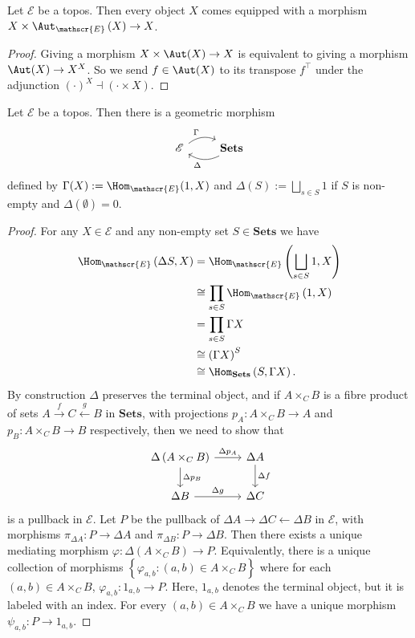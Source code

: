 \begin{lemma}
Let $\mathscr{E}$ be a topos. Then every object $X$ comes equipped with a morphism $X \times \Aut_{\mathscr{E}}\left(X \right) \to X$.
\end{lemma}
\begin{proof}
Giving a morphism $X \times \Aut(X) \to X$ is equivalent to giving a morphism $\Aut(X) \to X^X$. So we send $f \in \Aut(X)$ to its transpose $f^\intercal$ under the adjunction $\left( \cdot \right)^X \dashv \left( \cdot \times X\right)$.
\end{proof}

\begin{proposition}
Let $\mathscr{E}$ be a topos. Then there is a geometric morphism
\[ \begin{tikzcd} \mathscr{E} \arrow[r, bend left, "\Gamma"] & \mathbf{Sets} \arrow[l, bend left, "\Delta"] \end{tikzcd} \]
defined by $\Gamma(X) := \Hom_{\mathscr{E}}(1, X)$ and $\Delta(S) := \bigsqcup_{s \in S} 1$ if $S$ is non-empty and $\Delta(\emptyset) = 0$.
\end{proposition}
\begin{proof}
For any $X \in \mathscr{E}$ and any non-empty set $S \in \mathbf{Sets}$ we have
\begin{align*}
\Hom_{\mathscr{E}}\left(\Delta S, X \right) &= \Hom_{\mathscr{E}} \left( \bigsqcup_{s \in S} 1, X \right) \\
&\cong \prod_{s \in S} \Hom_{\mathscr{E}} \left(1, X \right) \\
&= \prod_{s \in S} \Gamma X \\
&\cong \left(\Gamma X \right)^{S} \\
&\cong \Hom_{\mathbf{Sets}}\left( S, \Gamma X \right).
\end{align*}
By construction $\Delta$ preserves the terminal object, and if $A \times_C B$ is a fibre product of sets $A \xrightarrow{f} C \xleftarrow{g} B$ in $\mathbf{Sets}$, with projections $p_A : A \times_C B \to A$ and $p_B : A \times_C B \to B$ respectively, then we need to show that
\[ \begin{tikzcd}
\Delta\left( A \times_C B \right) \arrow[r, "\Delta p_A"] \arrow[d, "\Delta p_B"] & \Delta A \arrow[d, "\Delta f"] \\
\Delta B \arrow[r, "\Delta g"] & \Delta C 
\end{tikzcd} \]
is a pullback in $\mathscr{E}$. Let $P$ be the pullback of $\Delta A \rightarrow \Delta C \leftarrow \Delta B$ in $\mathscr{E}$, with morphisms $\pi_{\Delta A} : P \to \Delta A$ and $\pi_{\Delta B} : P \to \Delta B$. Then there exists a unique mediating morphism $\varphi : \Delta \left( A \times_C B \right) \to P$. Equivalently, there is a unique collection of morphisms $\left\{ \varphi_{a,b} : (a,b) \in A \times_C B \right\}$ where for each $(a,b) \in A \times_C B$, $\varphi_{a,b} : 1_{a,b} \to P$. Here, $1_{a,b}$ denotes the terminal object, but it is labeled with an index. For every $(a,b) \in A \times_C B$ we have a unique morphism $ \psi_{a,b} : P \to 1_{a,b}$.
\end{proof}

